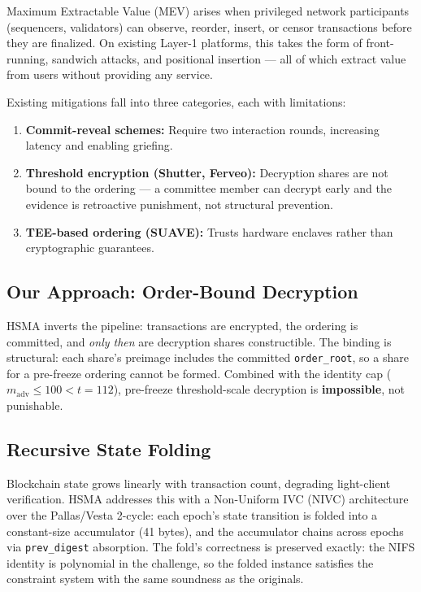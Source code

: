 \documentclass[11pt,a4paper]{article}
\begin{document}
Maximum Extractable Value (MEV) arises when privileged network
participants (sequencers, validators) can observe, reorder, insert, or
censor transactions before they are finalized. On existing Layer-1
platforms, this takes the form of front-running, sandwich attacks, and
positional insertion --- all of which extract value from users without
providing any service.

Existing mitigations fall into three categories, each with limitations:

\begin{enumerate}
\item \textbf{Commit-reveal schemes:} Require two interaction rounds,
  increasing latency and enabling griefing.
\item \textbf{Threshold encryption (Shutter, Ferveo):} Decryption shares
  are not bound to the ordering --- a committee member can decrypt early
  and the evidence is retroactive punishment, not structural prevention.
\item \textbf{TEE-based ordering (SUAVE):} Trusts hardware enclaves
  rather than cryptographic guarantees.
\end{enumerate}

\subsection{Our Approach: Order-Bound Decryption}

HSMA inverts the pipeline: transactions are encrypted, the ordering is
committed, and \emph{only then} are decryption shares constructible.
The binding is structural: each share's preimage includes the committed
\texttt{order\_root}, so a share for a pre-freeze ordering cannot be
formed. Combined with the identity cap ($m_{\text{adv}} \le 100 <
t = 112$), pre-freeze threshold-scale decryption is
\textbf{impossible}, not punishable.

\subsection{Recursive State Folding}

Blockchain state grows linearly with transaction count, degrading
light-client verification. HSMA addresses this with a Non-Uniform IVC
(NIVC) architecture over the Pallas/Vesta 2-cycle: each epoch's state
transition is folded into a constant-size accumulator (41 bytes), and
the accumulator chains across epochs via \texttt{prev\_digest}
absorption. The fold's correctness is preserved exactly: the NIFS
identity is polynomial in the challenge, so the folded instance
satisfies the constraint system with the same soundness as the
originals.
\end{document}
